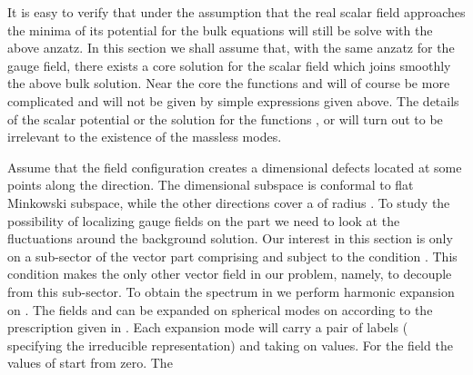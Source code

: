 \documentclass[a4paper,12pt]{article}
\begin{document}
It is easy to verify that under the assumption that the  real scalar
field approaches the minima of its potential for \coordHE{} the bulk equations will still  be solve with the above
anzatz.  In this section we shall assume that, with the same anzatz
for the gauge field,  there exists a core solution for the scalar
field which joins smoothly the above bulk solution.  Near the core
the functions \coordHE{} and \coordHE{} will of course be more complicated and will
not be given by simple expressions given above. The details of the
scalar potential or the solution for the functions \myHighlight{$\Phi$}\coordHE{}, \coordHE{} or \coordHE{}
will turn out to be irrelevant to the existence of the massless
modes.

Assume that the \myHighlight{$\Phi$}\coordHE{} field configuration creates a \coordHE{}
dimensional defects located at some points along the \coordHE{}
direction. The \coordHE{} dimensional subspace is conformal to flat
Minkowski subspace, while the other \coordHE{} directions cover a \coordHE{}
of radius \coordHE{}. To study the possibility of localizing gauge fields
on the \coordHE{} part we need to look at the fluctuations
around the background solution. Our interest in this section is
only on a sub-sector of the vector part comprising \coordHE{} and
\coordHE{} subject to the condition \coordHE{}. This condition makes the only other
vector field in our problem, namely, \coordHE{} to decouple from
this sub-sector. To obtain the spectrum in \coordHE{} we
perform harmonic expansion on \coordHE{}. The fields \coordHE{} and \coordHE{} can be expanded on
spherical modes on \coordHE{} according to the prescription given in
\cite{Randjbar-Daemi:1982hi,Randjbar-Daemi:1983bw}. Each expansion
mode will carry a pair of \coordHE{} labels \coordHE{} ( specifying the
\coordHE{} irreducible representation) and \myHighlight{$\lambda$}\coordHE{} taking on \coordHE{}
values. For the field \coordHE{} the values of \coordHE{} start from zero. The
\end{document}
